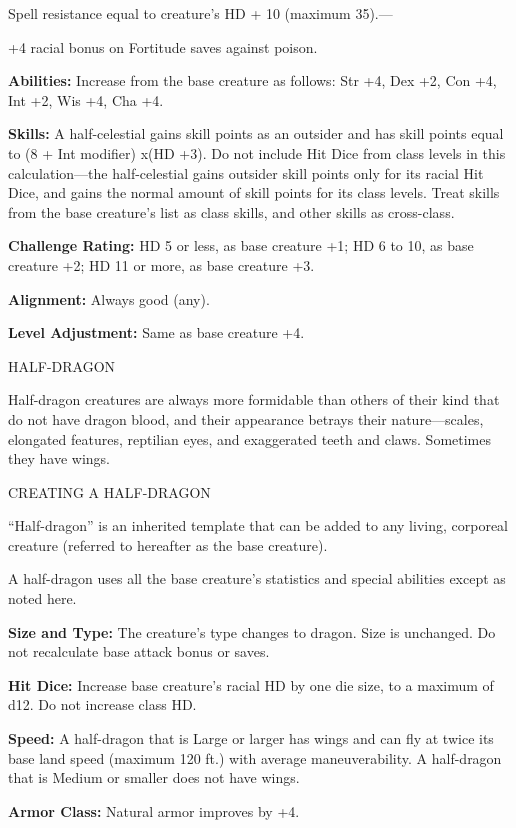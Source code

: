 \documentclass{article}
\begin{document}
Spell resistance equal to creature's HD + 10 (maximum 35).--- 

\parindent=3pt
+4 racial bonus on Fortitude saves against poison.

\parindent=0pt
\textbf{Abilities:} Increase from the base creature as follows: Str +4, Dex +2, 
Con +4, Int +2, Wis +4, Cha +4.

\textbf{Skills:} A half-celestial gains skill points as an outsider and has skill 
points equal to (8 + Int modifier) x$ $(HD +3). Do not include Hit Dice from class 
levels in this calculation---the half-celestial gains outsider skill points only 
for its racial Hit Dice, and gains the normal amount of skill points for its class 
levels. Treat skills from the base creature's list as class skills, and other skills 
as cross-class. 

\textbf{Challenge Rating:} HD 5 or less, as base creature +1; HD 6 to 10, as base 
creature +2; HD 11 or more, as base creature +3.

\textbf{Alignment:} Always good (any).

\textbf{Level Adjustment:} Same as base creature +4.

\vspace{12pt}
{\LARGE{}HALF-DRAGON}

Half-dragon creatures are always more formidable than others of their kind that 
do not have dragon blood, and their appearance betrays their nature---scales, elongated 
features, reptilian eyes, and exaggerated teeth and claws. Sometimes they have 
wings.

CREATING A HALF-DRAGON

``Half-dragon'' is an inherited template that can be added to any living, corporeal 
creature (referred to hereafter as the base creature).

A half-dragon uses all the base creature's statistics and special abilities except 
as noted here.

\textbf{Size and Type:} The creature's type changes to dragon. Size is unchanged. 
Do not recalculate base attack bonus or saves.

\textbf{Hit Dice:} Increase base creature's racial HD by one die size, to a maximum 
of d12. Do not increase class HD.

\textbf{Speed:} A half-dragon that is Large or larger has wings and can fly at 
twice its base land speed (maximum 120 ft.) with average maneuverability. A half-dragon 
that is Medium or smaller does not have wings.

\textbf{Armor Class:} Natural armor improves by +4. 
\end{document}
